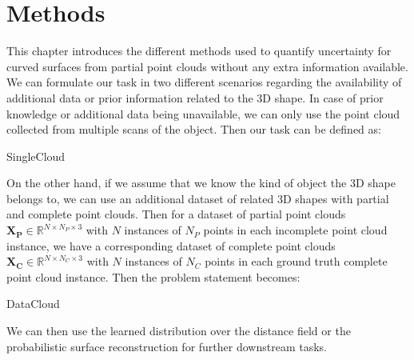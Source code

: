 \chapter{Methods}\label{ch:methods}
This chapter introduces the different methods used to quantify uncertainty for curved surfaces from partial point clouds without any extra information available. We can formulate our task in two different scenarios regarding the availability of additional data or prior information related to the 3D shape. In case of prior knowledge or additional data being unavailable, we can only use the point cloud collected from multiple scans of the object. Then our task can be defined as:
\begin{problemnotitle}{SingleCloud}{}
\end{problemnotitle}

On the other hand, if we assume that we know the kind of object the 3D shape belongs to, we can use an additional dataset of related 3D shapes with partial and complete point clouds. Then for a dataset of partial point clouds $\mathbf{X_P} \in \mathbb{R}^{N \times N_P \times 3}$ with $N$ instances of $N_P$ points in each incomplete point cloud instance, we have a corresponding dataset of complete point clouds $\mathbf{X_C} \in \mathbb{R}^{N \times N_C \times 3}$ with $N$ instances of $N_C$ points in each ground truth complete point cloud instance. Then the problem statement becomes:
\begin{problemnotitle}{DataCloud}{}
\end{problemnotitle}

We can then use the learned distribution over the distance field or the probabilistic surface reconstruction for further downstream tasks.


